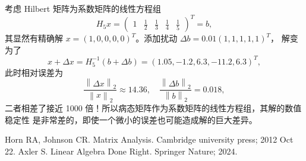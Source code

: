 \documentclass[fontset=none,zihao=-4]{Notes}
\newcommand{\norm}[1]{\left\lVert#1\right\rVert}
\begin{document}
\begin{example}
  考虑 Hilbert 矩阵为系数矩阵的线性方程组
  \[
    H_5x=\begin{pmatrix}
      1 &
      \frac{1}{2}&
      \frac{1}{3}&
      \frac{1}{4} &
      \frac{1}{5}
    \end{pmatrix}^T=b,
  \]
  其显然有精确解 $x=(1,0,0,0,0)^T$。添加扰动 $\Delta b=0.01(1,1,1,1,1)^T$，
  解变为了
  \[
    x+\Delta x=H_5^{-1}(b+\Delta b)=(1.05,-1.2,6.3,-11.2,6.3)^T,  
  \]
  此时相对误差为
  \[
    \frac{\norm{\Delta x}_2}{\norm{x}_2}\approx 14.36,\quad
    \frac{\norm{\Delta b}_2}{\norm{b}_2}=  0.018,
  \]
  二者相差了接近 1000 倍！所以病态矩阵作为系数矩阵的线性方程组，其解的数值稳定性
  是非常差的，即使一个微小的误差也可能造成解的巨大差异。
\end{example}



\begin{thebibliography}{99}
   Horn RA, Johnson CR. Matrix Analysis. Cambridge university press; 2012 Oct 22.
    Axler S. Linear Algebra Done Right. Springer Nature; 2024.
\end{thebibliography}
\end{document}
